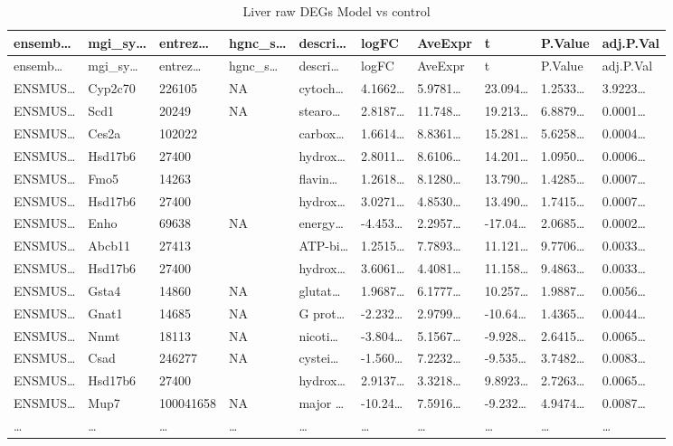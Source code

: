 \documentclass[
]{article}
\begin{document}
\begin{longtable}[]{@{}llllllllll@{}}
\caption{\label{tab:Liver-raw-DEGs-Model-vs-control}Liver raw DEGs Model vs control}\tabularnewline
\toprule
ensemb\ldots{} & mgi\_sy\ldots{} & entrez\ldots{} & hgnc\_s\ldots{} & descri\ldots{} & logFC & AveExpr & t & P.Value & adj.P.Val\tabularnewline
\midrule
\endfirsthead
\toprule
ensemb\ldots{} & mgi\_sy\ldots{} & entrez\ldots{} & hgnc\_s\ldots{} & descri\ldots{} & logFC & AveExpr & t & P.Value & adj.P.Val\tabularnewline
\midrule
\endhead
ENSMUS\ldots{} & Cyp2c70 & 226105 & NA & cytoch\ldots{} & 4.1662\ldots{} & 5.9781\ldots{} & 23.094\ldots{} & 1.2533\ldots{} & 3.9223\ldots{}\tabularnewline
ENSMUS\ldots{} & Scd1 & 20249 & NA & stearo\ldots{} & 2.8187\ldots{} & 11.748\ldots{} & 19.213\ldots{} & 6.8879\ldots{} & 0.0001\ldots{}\tabularnewline
ENSMUS\ldots{} & Ces2a & 102022 & & carbox\ldots{} & 1.6614\ldots{} & 8.8361\ldots{} & 15.281\ldots{} & 5.6258\ldots{} & 0.0004\ldots{}\tabularnewline
ENSMUS\ldots{} & Hsd17b6 & 27400 & & hydrox\ldots{} & 2.8011\ldots{} & 8.6106\ldots{} & 14.201\ldots{} & 1.0950\ldots{} & 0.0006\ldots{}\tabularnewline
ENSMUS\ldots{} & Fmo5 & 14263 & & flavin\ldots{} & 1.2618\ldots{} & 8.1280\ldots{} & 13.790\ldots{} & 1.4285\ldots{} & 0.0007\ldots{}\tabularnewline
ENSMUS\ldots{} & Hsd17b6 & 27400 & & hydrox\ldots{} & 3.0271\ldots{} & 4.8530\ldots{} & 13.490\ldots{} & 1.7415\ldots{} & 0.0007\ldots{}\tabularnewline
ENSMUS\ldots{} & Enho & 69638 & NA & energy\ldots{} & -4.453\ldots{} & 2.2957\ldots{} & -17.04\ldots{} & 2.0685\ldots{} & 0.0002\ldots{}\tabularnewline
ENSMUS\ldots{} & Abcb11 & 27413 & & ATP-bi\ldots{} & 1.2515\ldots{} & 7.7893\ldots{} & 11.121\ldots{} & 9.7706\ldots{} & 0.0033\ldots{}\tabularnewline
ENSMUS\ldots{} & Hsd17b6 & 27400 & & hydrox\ldots{} & 3.6061\ldots{} & 4.4081\ldots{} & 11.158\ldots{} & 9.4863\ldots{} & 0.0033\ldots{}\tabularnewline
ENSMUS\ldots{} & Gsta4 & 14860 & NA & glutat\ldots{} & 1.9687\ldots{} & 6.1777\ldots{} & 10.257\ldots{} & 1.9887\ldots{} & 0.0056\ldots{}\tabularnewline
ENSMUS\ldots{} & Gnat1 & 14685 & NA & G prot\ldots{} & -2.232\ldots{} & 2.9799\ldots{} & -10.64\ldots{} & 1.4365\ldots{} & 0.0044\ldots{}\tabularnewline
ENSMUS\ldots{} & Nnmt & 18113 & NA & nicoti\ldots{} & -3.804\ldots{} & 5.1567\ldots{} & -9.928\ldots{} & 2.6415\ldots{} & 0.0065\ldots{}\tabularnewline
ENSMUS\ldots{} & Csad & 246277 & NA & cystei\ldots{} & -1.560\ldots{} & 7.2232\ldots{} & -9.535\ldots{} & 3.7482\ldots{} & 0.0083\ldots{}\tabularnewline
ENSMUS\ldots{} & Hsd17b6 & 27400 & & hydrox\ldots{} & 2.9137\ldots{} & 3.3218\ldots{} & 9.8923\ldots{} & 2.7263\ldots{} & 0.0065\ldots{}\tabularnewline
ENSMUS\ldots{} & Mup7 & 100041658 & NA & major \ldots{} & -10.24\ldots{} & 7.5916\ldots{} & -9.232\ldots{} & 4.9474\ldots{} & 0.0087\ldots{}\tabularnewline
\ldots{} & \ldots{} & \ldots{} & \ldots{} & \ldots{} & \ldots{} & \ldots{} & \ldots{} & \ldots{} & \ldots{}\tabularnewline
\bottomrule
\end{longtable}
\end{document}
